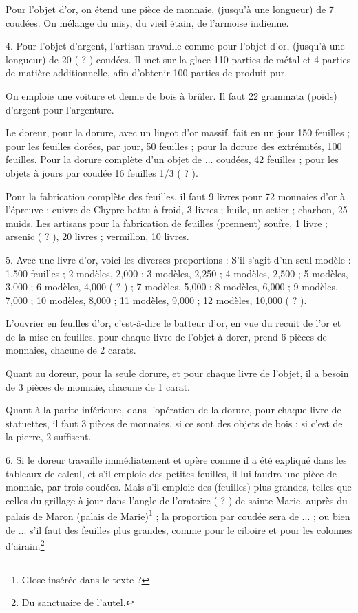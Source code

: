 \documentclass[a4paper, 11pt, oneside, polutonikogreek, french]{article}
\begin{document}
Pour l'objet d'or, on étend une pièce de monnaie, (jusqu'à une longueur) de 7 coudées. On mélange du misy, du vieil étain, de l'armoise indienne.

4. Pour l'objet d'argent, l'artisan travaille comme pour l'objet d'or, (jusqu'à une longueur) de 20 ( ? ) coudées. Il met sur la glace 110 parties de métal et 4 parties de matière additionnelle, afin d'obtenir 100 parties de produit pur.

On emploie une voiture et demie de bois à brûler. Il faut 22 grammata (poids) d'argent pour l'argenture.

Le doreur, pour la dorure, avec un lingot d'or massif, fait en un jour 150 feuilles ; pour les feuilles dorées, par jour, 50 feuilles ; pour la dorure des extrémités, 100 feuilles. Pour la dorure complète d'un objet de ... coudées, 42 feuilles ; pour les objets à jours par coudée 16 feuilles 1/3 ( ? ).

Pour la fabrication complète des feuilles, il faut 9 livres pour 72 monnaies d'or à l'épreuve ; cuivre de Chypre battu à froid, 3 livres ; huile, un setier ; charbon, 25 muids. Les artisans pour la fabrication de feuilles (prennent) soufre, 1 livre ; arsenic ( ? ), 20 livres ; vermillon, 10 livres.

5. Avec une livre d'or, voici les diverses proportions : S'il s'agit d'un seul modèle : 1,500 feuilles ; 2 modèles, 2,000 ; 3 modèles, 2,250 ; 4 modèles, 2,500 ; 5 modèles, 3,000 ; 6 modèles, 4,000 ( ? ) ; 7 modèles, 5,000 ; 8 modèles, 6,000 ; 9 modèles, 7,000 ; 10 modèles, 8,000 ; 11 modèles, 9,000 ; 12 modèles, 10,000 ( ? ).

L'ouvrier en feuilles d'or, c'est-à-dire le batteur d'or, en vue du recuit de l'or et de la mise en feuilles, pour chaque livre de l'objet à dorer, prend 6 pièces de monnaies, chacune de 2 carats.

Quant au doreur, pour la seule dorure, et pour chaque livre de l'objet, il a besoin de 3 pièces de monnaie, chacune de 1 carat.

Quant à la parite inférieure, dans l'opération de la dorure, pour chaque livre de statuettes, il faut 3 pièces de monnaies, si ce sont des objets de bois ; si c'est de la pierre, 2 suffisent.

6. Si le doreur travaille immédiatement et opère comme il a été expliqué dans les tableaux de calcul, et s'il emploie des petites feuilles, il lui faudra une pièce de monnaie, par trois coudées. Mais s'il emploie des (feuilles) plus grandes, telles que celles du grillage à jour dans l'angle de l'oratoire ( ? ) de sainte Marie, auprès du palais de Maron (palais de Marie)\footnote{Glose insérée dans le texte ?} ; la proportion par coudée sera de ... ; ou bien de ... s'il faut des feuilles plus grandes, comme pour le ciboire et pour les colonnes d'airain.\footnote{Du sanctuaire de l'autel.}
\end{document}
